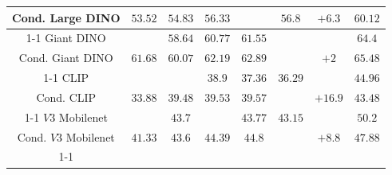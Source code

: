 \begin{table}[!htbp]
{\begin{tabular}{c|ccccccc}
			Cond. Large DINO   & \multirow{-2}{*}{$53.52$}                                                     & \textit{$54.83$}          & \textit{$56.33$}          & \textit{\pmb{$56.87$}} & \textit{$56.8$}           & \multirow{-2}{*}{{\color[HTML]{009901} $+6.3$}}                             & $60.12$                                                                          \\ \cline{1-1}
			Giant DINO         &                                                                             & \textit{$58.64$}          & \textit{$60.77$}          & \textit{$61.55$}          & \textit{\pmb{$61.65$}} & {\color[HTML]{009901} }                                                   & $64.4$                                                                           \\
			Cond. Giant DINO   & \multirow{-2}{*}{$61.68$}                                                     & \textit{$60.07$}          & \textit{$62.19$}          & \textit{$62.89$}          & \textit{\pmb{$62.92$}} & \multirow{-2}{*}{{\color[HTML]{009901} $+2$}}                               & $65.48$                                                                          \\ \cline{1-1}
			CLIP               &                                                                             & \textit{\pmb{$39.12$}} & \textit{$38.9$}           & \textit{$37.36$}          & \textit{$36.29$}          & {\color[HTML]{009901} }                                                   & $44.96$                                                                          \\
			Cond. CLIP         & \multirow{-2}{*}{$33.88$}                                                     & \textit{$39.48$}          & \textit{$39.53$}          & \textit{$39.57$}          & \textit{\pmb{$39.61$}} & \multirow{-2}{*}{{\color[HTML]{009901} $+16.9$}}                            & $43.48$                                                                          \\ \cline{1-1}
			$V3$ Mobilenet       &                                                                             & \textit{$43.7$}           & \textit{\pmb{$44.39$}} & \textit{$43.77$}          & \textit{$43.15$}          & {\color[HTML]{009901} }                                                   & $50.2$                                                                           \\
			Cond. $V3$ Mobilenet & \multirow{-2}{*}{$41.33$}                                                     & \textit{$43.6$}           & \textit{$44.39$}          & \textit{$44.8$}           & \textit{\pmb{$44.95$}} & \multirow{-2}{*}{{\color[HTML]{009901} $+8.8$}}                             & $47.88$                                                                          \\ \cline{1-1}

\end{tabular}}
\end{table}
